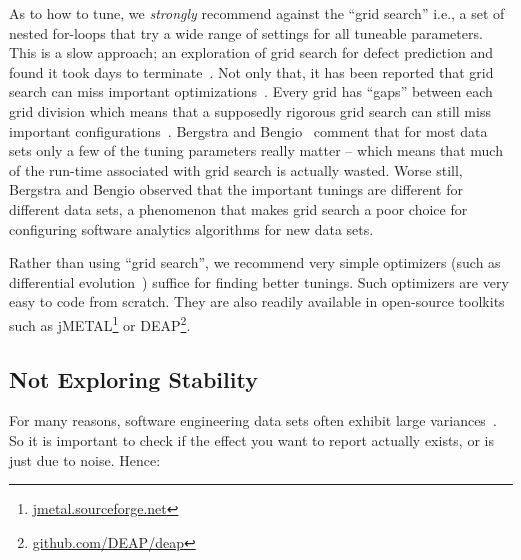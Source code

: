 \documentclass[preprint,10pt]{elsarticle}
\begin{document}
As to how to tune, we {\em strongly} recommend against the ``grid search'' i.e., a set of nested for-loops that try a wide range of settings for all tuneable parameters. This is a slow approach; an exploration of grid search for defect prediction and found it took days to terminate~\cite{fu2016}.  Not only that, it has been reported that grid search can miss important optimizations~\cite{Fu16}. Every grid has “gaps” between each grid division which means that a supposedly rigorous grid search can still miss important configurations~\cite{bergstra2012random}. Bergstra and Bengio~\cite{bergstra2012random} comment that for most data sets only a few of the tuning parameters really matter – which means that much of the run-time associated with grid search is actually wasted.  Worse still, Bergstra and Bengio observed that the important tunings are different for different data sets, a phenomenon that makes grid search a poor choice for configuring software analytics algorithms for new data sets.
 
Rather than using ``grid search'', we recommend very simple optimizers (such as differential evolution~\cite{Storn1997}) suffice for finding better tunings. Such optimizers are very easy to code from scratch. They are also readily available in open-source toolkits such as jMETAL\footnote{
\href{http://jmetal.sourceforge.net}{jmetal.sourceforge.net}} or DEAP\footnote{\href{http://github.com/DEAP/deap}{github.com/DEAP/deap}}.


\subsection{Not Exploring Stability}

For many reasons, software engineering data sets often exhibit large variances~\cite{menzies12}. So it is important to check if the effect you want to report actually exists, or is just due to noise. Hence:
\end{document}
